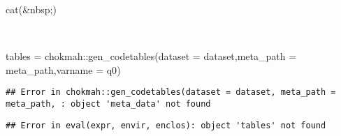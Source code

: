 \documentclass[
]{article}
\newenvironment{Shaded}{\begin{snugshade}}{\end{snugshade}}
\newcommand{\AttributeTok}[1]{\textcolor[rgb]{0.77,0.63,0.00}{#1}}
\newcommand{\FunctionTok}[1]{\textcolor[rgb]{0.00,0.00,0.00}{#1}}
\newcommand{\NormalTok}[1]{#1}
\newcommand{\OtherTok}[1]{\textcolor[rgb]{0.56,0.35,0.01}{#1}}
\newcommand{\SpecialCharTok}[1]{\textcolor[rgb]{0.00,0.00,0.00}{#1}}
\newcommand{\StringTok}[1]{\textcolor[rgb]{0.31,0.60,0.02}{#1}}
\begin{document}
\begin{minipage}[t]{0.3\linewidth}

\begin{Shaded}
\begin{Highlighting}[]
\FunctionTok{cat}\NormalTok{(}\StringTok{\textquotesingle{}\&nbsp;\textquotesingle{}}\NormalTok{)}
\end{Highlighting}
\end{Shaded}

~

\end{minipage}%
\begin{minipage}[t]{0.7\linewidth}

\begin{Shaded}
\begin{Highlighting}[]
\NormalTok{tables }\OtherTok{=}\NormalTok{ chokmah}\SpecialCharTok{::}\FunctionTok{gen\_codetables}\NormalTok{(}\AttributeTok{dataset =}\NormalTok{ dataset,}\AttributeTok{meta\_path =}\NormalTok{ meta\_path,}\AttributeTok{varname =} \StringTok{\textquotesingle{}q0\textquotesingle{}}\NormalTok{)}
\end{Highlighting}
\end{Shaded}

\begin{verbatim}
## Error in chokmah::gen_codetables(dataset = dataset, meta_path = meta_path, : object 'meta_data' not found
\end{verbatim}

\begin{Shaded}
\end{Shaded}

\begin{verbatim}
## Error in eval(expr, envir, enclos): object 'tables' not found
\end{verbatim}


\end{minipage}
\end{document}
